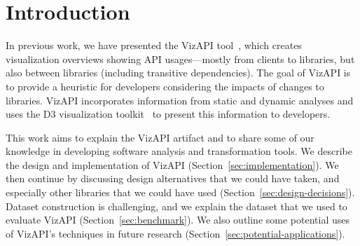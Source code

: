 \section{Introduction}
\label{sec:introduction}

In previous work, we have presented the VizAPI tool~\cite{venkatanarayanan22:_vizap,venkatanarayanan22:_study_lever_api_usage_patter}, which creates visualization overviews showing API usages---mostly from clients to libraries, but also between libraries (including transitive dependencies). The goal of VizAPI is to provide a heuristic for developers considering the impacts of changes to libraries. VizAPI incorporates information from static and dynamic analyses and uses the D3 visualization toolkit~\cite{bostock2011} to present this information to developers.

This work aims to explain the VizAPI artifact and to share some of our knowledge in developing software analysis and transformation tools. We describe the design and implementation of VizAPI (Section~\ref{sec:implementation}). We then continue by discussing design alternatives that we could have taken, and especially other libraries that we could have used (Section~\ref{sec:design-decisions}). Dataset construction is challenging, and we explain the dataset that we used to evaluate VizAPI (Section~\ref{sec:benchmark}). We also outline some potential uses of VizAPI's techniques in future research (Section~\ref{sec:potential-applications}).



